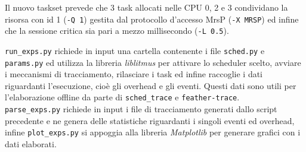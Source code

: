 \begin{appendices}
Il nuovo taskset prevede che 3 task allocati nelle CPU 0, 2 e 3 condividano la risorsa con id 1 (\texttt{-Q 1}) gestita dal protocollo d'accesso MrsP (\texttt{-X MRSP}) ed infine che la sessione critica sia pari a mezzo millisecondo (\texttt{-L 0.5}).

\texttt{run\_exps.py} richiede in input una cartella contenente i file \texttt{sched.py} e \texttt{params.py} ed utilizza la libreria \textit{liblitmus} per attivare lo scheduler scelto, avviare i meccanismi di tracciamento, rilasciare i task ed infine raccoglie i dati riguardanti l'esecuzione, cioè gli overhead e gli eventi. Questi dati sono utili per l'elaborazione offline da parte di \texttt{sched\_trace} e \texttt{feather-trace}.\\

\texttt{parse\_exps.py} richiede in input i file di tracciamento generati dallo script precedente e ne genera delle statistiche riguardanti i singoli eventi ed overhead, infine \texttt{plot\_exps.py} si appoggia alla libreria \textit{Matplotlib} per generare grafici con i dati elaborati.

\end{appendices}